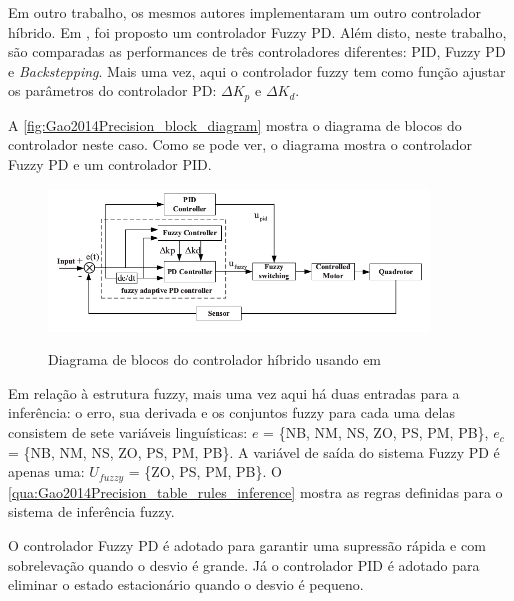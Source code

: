 
Em outro trabalho, os mesmos autores implementaram um outro controlador híbrido. Em \cite{Gao2014Precision}, foi proposto um controlador Fuzzy PD. Além disto, neste trabalho, são comparadas as performances de três controladores diferentes: PID, Fuzzy PD e \textit{Backstepping}. Mais uma vez, aqui o controlador fuzzy tem como função ajustar os parâmetros do controlador PD: $\Delta K_p$ e $\Delta K_d$.

A \autoref{fig:Gao2014Precision_block_diagram} mostra o diagrama de blocos do controlador neste caso. Como se pode ver, o diagrama mostra o controlador Fuzzy PD e um controlador PID.

\begin{figure}[!htb]
    \centering
    \caption{Diagrama de blocos do controlador híbrido usando em \cite{Gao2014Precision}}
    \includegraphics[width=0.9\textwidth]{./04-figuras/Gao2014Precision_block_diagram}
    \label{fig:Gao2014Precision_block_diagram}
\end{figure}

Em relação à estrutura fuzzy, mais uma vez aqui há duas entradas para a inferência: o erro, sua derivada e os conjuntos fuzzy para cada uma delas consistem de sete variáveis linguísticas: $e$ = \{NB, NM, NS, ZO, PS, PM, PB\}, $e_c$ = \{NB, NM, NS, ZO, PS, PM, PB\}. A variável de saída do sistema Fuzzy PD é apenas uma: $U_{fuzzy}$ = \{ZO, PS, PM, PB\}. O \autoref{qua:Gao2014Precision_table_rules_inference} mostra as regras definidas para o sistema de inferência fuzzy.



O controlador Fuzzy PD é adotado para garantir uma supressão rápida e com sobrelevação quando o desvio é grande. Já o controlador PID é adotado para eliminar o estado estacionário quando o desvio é pequeno.

